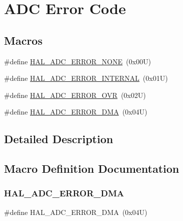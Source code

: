 \hypertarget{group___a_d_c___error___code}{}\section{A\+DC Error Code}
\label{group___a_d_c___error___code}
\subsection*{Macros}
\begin{DoxyCompactItemize}
\item 
\#define \hyperlink{group___a_d_c___error___code_ga93b4576d46ee0f8c53b7d69f39778e38}{H\+A\+L\+\_\+\+A\+D\+C\+\_\+\+E\+R\+R\+O\+R\+\_\+\+N\+O\+NE}~(0x00\+U)
\item 
\#define \hyperlink{group___a_d_c___error___code_ga7182f9ffc028f217db8724c7bc348f2f}{H\+A\+L\+\_\+\+A\+D\+C\+\_\+\+E\+R\+R\+O\+R\+\_\+\+I\+N\+T\+E\+R\+N\+AL}~(0x01\+U)
\item 
\#define \hyperlink{group___a_d_c___error___code_ga30ce24556ebd3c0341558c700a3b9add}{H\+A\+L\+\_\+\+A\+D\+C\+\_\+\+E\+R\+R\+O\+R\+\_\+\+O\+VR}~(0x02\+U)
\item 
\#define \hyperlink{group___a_d_c___error___code_gaea82628f53a8e30db3f3426922acf60f}{H\+A\+L\+\_\+\+A\+D\+C\+\_\+\+E\+R\+R\+O\+R\+\_\+\+D\+MA}~(0x04\+U)
\end{DoxyCompactItemize}


\subsection{Detailed Description}


\subsection{Macro Definition Documentation}
\mbox{\label{group___a_d_c___error___code_gaea82628f53a8e30db3f3426922acf60f}} 
\subsubsection{\texorpdfstring{H\+A\+L\+\_\+\+A\+D\+C\+\_\+\+E\+R\+R\+O\+R\+\_\+\+D\+MA}{HAL\_ADC\_ERROR\_DMA}}
{\footnotesize\ttfamily \#define H\+A\+L\+\_\+\+A\+D\+C\+\_\+\+E\+R\+R\+O\+R\+\_\+\+D\+MA~(0x04\+U)}

